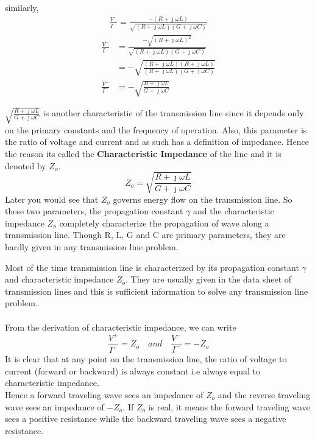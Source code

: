 similarly,
\begin{align*}
\frac{V^-}{I^-} = \frac{-(R+\jmath\omega L)}{\sqrt{(R + \jmath\omega L)(G + \jmath\omega C)}}
\end{align*}
\begin{align*}
\frac{V^-}{I^-} &= \frac{-\sqrt{(R+\jmath\omega L)^2}}{\sqrt{(R + \jmath\omega L)(G + \jmath\omega C)}}\\
&=-\sqrt{\frac{(R+\jmath\omega L)(R+\jmath\omega L)}{(R + \jmath\omega L)(G + \jmath\omega C)}}\\
\frac{V^-}{I^-} &=-\sqrt{\frac{R+\jmath\omega L}{G+\jmath\omega C}}
\end{align*}

$\sqrt{\frac{R+\jmath\omega L}{G+\jmath\omega C}}$ is another characteristic of the transmission line since it depends only on the primary constants and the frequency of operation. Also, this parameter is the ratio of voltage and current and as such has a definition of impedance. Hence the reason its called the \textbf{Characteristic Impedance} of the line and it is denoted by $Z_o$.
\begin{equation}
Z_o = \sqrt{\frac{R+\jmath\omega L}{G+\jmath\omega C}}
\end{equation}
Later you would see that $Z_o$ governs energy flow on the transmission line. So these two parameters, the propagation constant $\gamma$ and the characteristic impedance $Z_o$ completely characterize the propagation of wave along a transmission line. Though R, L, G and C are primary parameters, they are hardly given in any transmission line problem. 

Most of the time transmission line is characterized by its propagation constant $\gamma$ and characteristic impedance $Z_o$. They are usually given in the data sheet of transmission lines and this is sufficient information to solve any transmission line problem.\\ \\
From the derivation of characteristic impedance, we can write
\begin{equation}
\frac{V^+}{I^+} = Z_o\quad and\quad \frac{V^-}{I^-} = -Z_o
\end{equation}
It is clear that at any point on the transmission line, the ratio of voltage to current (forward or backward) is always constant i.e always equal to characteristic impedance.\\

Hence a forward traveling wave sees an impedance of $Z_o$ and the reverse traveling wave sees an impedance of $-Z_o$. If $Z_o$ is real, it means the forward traveling wave sees a positive resistance while the backward traveling wave sees a negative resistance.

